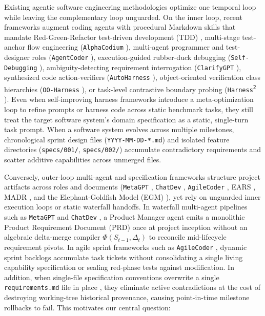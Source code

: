 \documentclass[11pt,a4paper,copyright]{google}
\begin{document}
Existing agentic software engineering methodologies optimize one temporal loop while leaving the complementary loop unguarded. On the inner loop, recent frameworks augment coding agents with procedural Markdown skills that mandate Red-Green-Refactor test-driven development (TDD) \cite{beck2002tdd,skillsbench2026,ahmed2024tddbench}, multi-stage test-anchor flow engineering (\texttt{AlphaCodium} \cite{ridnik2024alphacodium}), multi-agent programmer and test-designer roles (\texttt{AgentCoder} \cite{huang2024agentcoder}), execution-guided rubber-duck debugging (\texttt{Self-Debugging} \cite{chen2024selfdebug}), ambiguity-detecting requirement interrogation (\texttt{ClarifyGPT} \cite{mu2024clarifygpt}), synthesized code action-verifiers (\texttt{AutoHarness} \cite{lou2026autoharness}), object-oriented verification class hierarchies (\texttt{OO-Harness} \cite{li2026ooharness}), or task-level contrastive boundary probing (\texttt{Harness\textsuperscript{2}} \cite{xu2026harness2}). Even when self-improving harness frameworks introduce a meta-optimization loop to refine prompts or harness code across static benchmark tasks, they still treat the target software system's domain specification as a static, single-turn task prompt. When a software system evolves across multiple milestones, chronological sprint design files (\texttt{YYYY-MM-DD-*.md}) and isolated feature directories (\texttt{specs/001/}, \texttt{specs/002/}) accumulate contradictory requirements and scatter additive capabilities across unmerged files.

Conversely, outer-loop multi-agent and specification frameworks structure project artifacts across roles and documents (\texttt{MetaGPT} \cite{hong2024metagpt}, \texttt{ChatDev} \cite{qian2024chatdev}, \texttt{AgileCoder} \cite{nguyen2025agilecoder}, EARS \cite{mavin2009ears}, MADR \cite{kopp2018madr}, and the Elephant-Goldfish Model (EGM) \cite{rensin2026elephant}), yet rely on unguarded inner execution loops or static waterfall handoffs. In waterfall multi-agent pipelines such as \texttt{MetaGPT} \cite{hong2024metagpt} and \texttt{ChatDev} \cite{qian2024chatdev}, a Product Manager agent emits a monolithic Product Requirement Document (PRD) once at project inception without an algebraic delta-merge compiler $\Phi(S_{t-1}, \Delta_t)$ to reconcile mid-lifecycle requirement pivots. In agile sprint frameworks such as \texttt{AgileCoder} \cite{nguyen2025agilecoder}, dynamic sprint backlogs accumulate task tickets without consolidating a single living capability specification or sealing red-phase tests against modification. In addition, when single-file specification conventions overwrite a single \texttt{requirements.md} file in place \cite{mavin2009ears}, they eliminate active contradictions at the cost of destroying working-tree historical provenance, causing point-in-time milestone rollbacks to fail. This motivates our central question:
\end{document}
